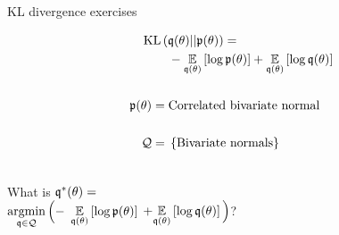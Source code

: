 \begin{frame}{KL divergence exercises}
\hspace{-3em}
\begin{minipage}{0.5\textwidth}
%
\begin{align*}
%
\MoveEqLeft
\kl{\q(\theta)}{\p(\theta)} ={}\\&
-\expect{\q(\theta)}{\log \p(\theta)} +
\expect{\q(\theta)}{\log \q(\theta)}\\ \\
\p(\theta) ={}& \textrm{Correlated bivariate normal}\\ \\
\qdom ={}& \left\{ \textrm{Bivariate normals}\right\}\\ \\
%
\end{align*}

What is $\mathfrak{q}^*(\theta) = $\\
$\underset{\mathfrak{q} \in \mathcal{Q}}{\mathrm{argmin}}\, \Big(-$
\sout{$\underset{\mathfrak{q}(\theta)}{\mathbb{E}}\left[\log \mathfrak{p}(\theta)\right]$}
$+ \underset{\mathfrak{q}(\theta)}{\mathbb{E}}\left[\log \mathfrak{q}(\theta)\right] \Big)$?
%
\end{minipage}
%
\begin{minipage}{0.4\textwidth}

\end{minipage}


\end{frame}




